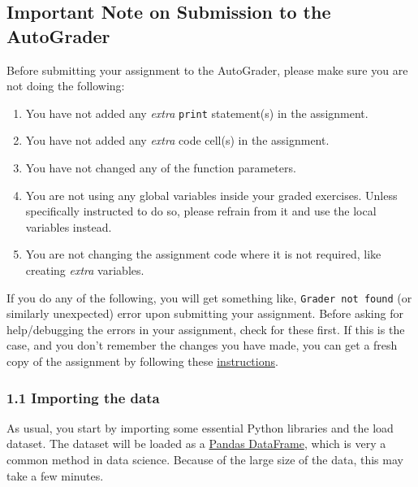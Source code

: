 \documentclass[11pt]{article}
\providecommand{\tightlist}{%
      \setlength{\itemsep}{0pt}\setlength{\parskip}{0pt}}
\begin{document}
\hypertarget{important-note-on-submission-to-the-autograder}{%
\subsection{Important Note on Submission to the
AutoGrader}\label{important-note-on-submission-to-the-autograder}}

Before submitting your assignment to the AutoGrader, please make sure
you are not doing the following:

\begin{enumerate}
\def\labelenumi{\arabic{enumi}.}
\tightlist
\item
  You have not added any \emph{extra} \texttt{print} statement(s) in the
  assignment.
\item
  You have not added any \emph{extra} code cell(s) in the assignment.
\item
  You have not changed any of the function parameters.
\item
  You are not using any global variables inside your graded exercises.
  Unless specifically instructed to do so, please refrain from it and
  use the local variables instead.
\item
  You are not changing the assignment code where it is not required,
  like creating \emph{extra} variables.
\end{enumerate}

If you do any of the following, you will get something like,
\texttt{Grader\ not\ found} (or similarly unexpected) error upon
submitting your assignment. Before asking for help/debugging the errors
in your assignment, check for these first. If this is the case, and you
don't remember the changes you have made, you can get a fresh copy of
the assignment by following these
\href{https://www.coursera.org/learn/classification-vector-spaces-in-nlp/supplement/YLuAg/h-ow-to-refresh-your-workspace}{instructions}.

\hypertarget{importing-the-data}{%
\subsubsection{1.1 Importing the data}\label{importing-the-data}}

As usual, you start by importing some essential Python libraries and the
load dataset. The dataset will be loaded as a
\href{https://pandas.pydata.org/pandas-docs/stable/getting_started/dsintro.html}{Pandas
DataFrame}, which is very a common method in data science. Because of
the large size of the data, this may take a few minutes.
\end{document}
